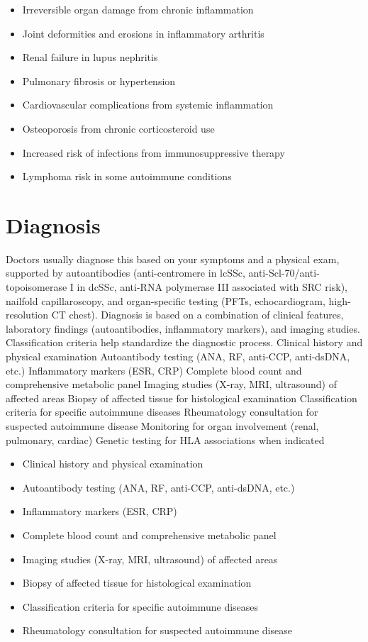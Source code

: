 \begin{itemize}[noitemsep]
  \item Irreversible organ damage from chronic inflammation
  \item Joint deformities and erosions in inflammatory arthritis
  \item Renal failure in lupus nephritis
  \item Pulmonary fibrosis or hypertension
  \item Cardiovascular complications from systemic inflammation
  \item Osteoporosis from chronic corticosteroid use
  \item Increased risk of infections from immunosuppressive therapy
  \item Lymphoma risk in some autoimmune conditions
\end{itemize}
\section{Diagnosis}
Doctors usually diagnose this based on your symptoms and a physical exam, supported by autoantibodies (anti-centromere in lcSSc, anti-Scl-70/anti-topoisomerase I in dcSSc, anti-RNA polymerase III associated with SRC risk), nailfold capillaroscopy, and organ-specific testing (PFTs, echocardiogram, high-resolution CT chest). Diagnosis is based on a combination of clinical features, laboratory findings (autoantibodies, inflammatory markers), and imaging studies. Classification criteria help standardize the diagnostic process. Clinical history and physical examination Autoantibody testing (ANA, RF, anti-CCP, anti-dsDNA, etc.) Inflammatory markers (ESR, CRP) Complete blood count and comprehensive metabolic panel Imaging studies (X-ray, MRI, ultrasound) of affected areas Biopsy of affected tissue for histological examination Classification criteria for specific autoimmune diseases Rheumatology consultation for suspected autoimmune disease Monitoring for organ involvement (renal, pulmonary, cardiac) Genetic testing for HLA associations when indicated

\begin{itemize}[noitemsep]
  \item Clinical history and physical examination
  \item Autoantibody testing (ANA, RF, anti-CCP, anti-dsDNA, etc.)
  \item Inflammatory markers (ESR, CRP)
  \item Complete blood count and comprehensive metabolic panel
  \item Imaging studies (X-ray, MRI, ultrasound) of affected areas
  \item Biopsy of affected tissue for histological examination
  \item Classification criteria for specific autoimmune diseases
  \item Rheumatology consultation for suspected autoimmune disease
\end{itemize}
